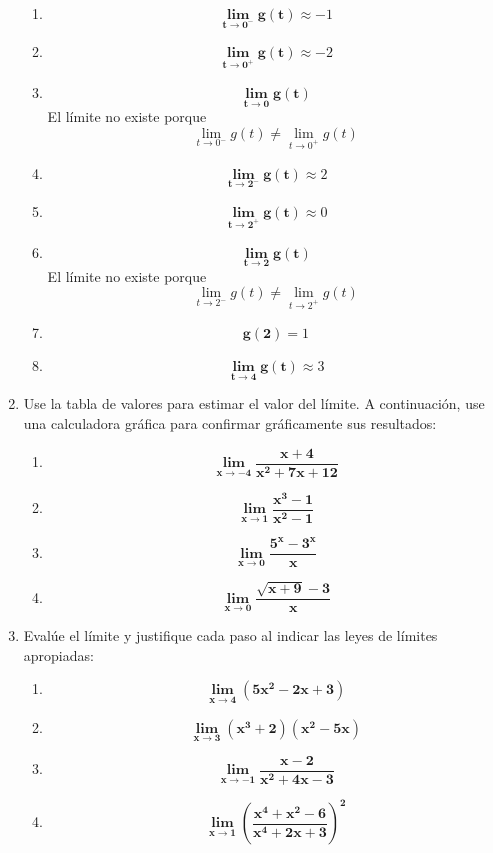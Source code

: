 \documentclass[12pt]{article}
\begin{document}
\begin{enumerate}
                \begin{enumerate}[label=\textbf{\alph*.}]
                    \item \[\bm{\lim_{t \to 0 ^-} g(t)} \approx -1\]
                    \item \[\bm{\lim_{t \to 0 ^+} g(t)} \approx -2\]
                    \item \[\bm{\lim_{t \to 0} g(t)}\] El límite no existe porque \[\lim_{t \to 0 ^-} g(t) \ne \lim_{t \to 0 ^+} g(t)\]
                    \item \[\bm{\lim_{t \to 2 ^-} g(t)} \approx 2\]
                    \item \[\bm{\lim_{t \to 2 ^+} g(t)} \approx 0\]
                    \item \[\bm{\lim_{t \to 2} g(t)}\] El límite no existe porque \[\lim_{t \to 2 ^-} g(t) \ne \lim_{t \to 2 ^+} g(t)\]
                    \item \[\bm{g(2)} = 1\]
                    \item \[\bm{\lim_{t \to 4} g(t)} \approx 3\]
                \end{enumerate}
            
            \item Use la tabla de valores para estimar el valor del límite. A continuación, use una calculadora gráfica para confirmar gráficamente sus resultados:
                \begin{enumerate}[label=\textbf{\arabic*)}] 
                    \item \[\bm{\lim_{x \to -4} \frac{x + 4}{x ^2 + 7x + 12}}\]
                    \item \[\bm{\lim_{x \to 1} \frac{x ^3 - 1}{x ^2 - 1}}\]
                    \item \[\bm{\lim_{x \to 0} \frac{5 ^x - 3^x }{x}}\]
                    \item \[\bm{\lim_{x \to 0} \frac{\sqrt{x + 9} - 3}{x}}\]
                \end{enumerate}

            
            \item Evalúe el límite y justifique cada paso al indicar las leyes de límites apropiadas:
                \begin{enumerate}[label=\textbf{\arabic*)}] 
                    \item \[\bm{\lim_{x \to 4} (5x ^2 - 2x + 3)}\]
                    \item \[\bm{\lim_{x \to 3} (x ^3 + 2)(x ^2 - 5x)}\]
                    \item \[\bm{\lim_{x \to -1} \frac{x - 2 }{x ^2 + 4x - 3}}\]
                    \item \[\bm{\lim_{x \to 1} \left(\frac{x^4 + x^2 - 6}{x^4 + 2x + 3}\right)^2}\]
                \end{enumerate}


\end{enumerate}
\end{document}
